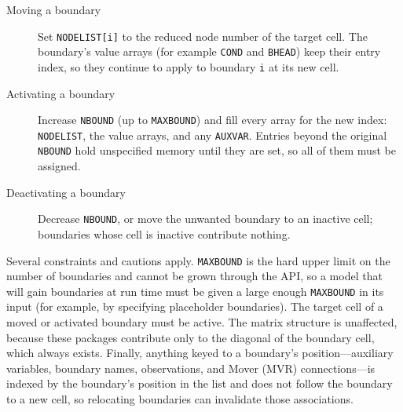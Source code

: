 \begin{description}
\item[Moving a boundary] Set \texttt{NODELIST[i]} to the reduced node number of
the target cell. The boundary's value arrays (for example \texttt{COND} and
\texttt{BHEAD}) keep their entry index, so they continue to apply to boundary
\texttt{i} at its new cell.
\item[Activating a boundary] Increase \texttt{NBOUND} (up to \texttt{MAXBOUND})
and fill every array for the new index: \texttt{NODELIST}, the value arrays, and
any \texttt{AUXVAR}. Entries beyond the original \texttt{NBOUND} hold
unspecified memory until they are set, so all of them must be assigned.
\item[Deactivating a boundary] Decrease \texttt{NBOUND}, or move the unwanted
boundary to an inactive cell; boundaries whose cell is inactive contribute
nothing.
\end{description}

\noindent Several constraints and cautions apply. \texttt{MAXBOUND} is the hard
upper limit on the number of boundaries and cannot be grown through the API, so a
model that will gain boundaries at run time must be given a large enough
\texttt{MAXBOUND} in its input (for example, by specifying placeholder
boundaries). The target cell of a moved or activated boundary must be active.
The matrix structure is unaffected, because these packages contribute only to the
diagonal of the boundary cell, which always exists. Finally, anything keyed to a
boundary's position---auxiliary variables, boundary names, observations, and
Mover (MVR) connections---is indexed by the boundary's position in the list and
does not follow the boundary to a new cell, so relocating boundaries can
invalidate those associations.
